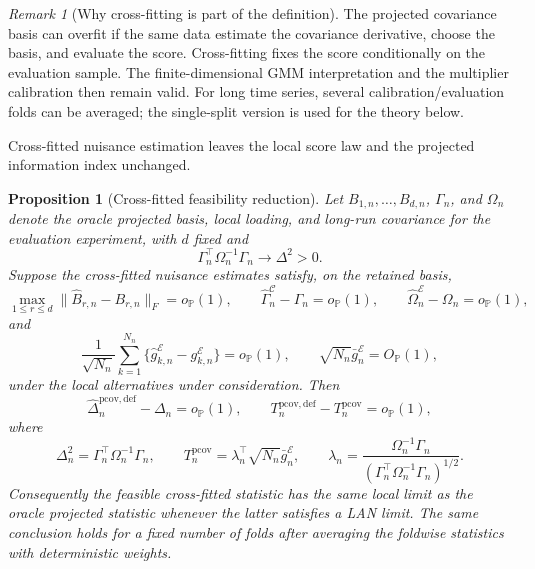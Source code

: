 \documentclass[11pt,a4paper]{amsart}
\theoremstyle{plain}
\newtheorem{proposition}[theorem]{Proposition}
\theoremstyle{definition}
\theoremstyle{remark}
\newtheorem{remark}[theorem]{Remark}
\newcommand{\PP}{\mathbb{P}}
\begin{document}
\begin{remark}[Why cross-fitting is part of the definition]
The projected covariance basis can overfit if the same data estimate the covariance derivative,
choose the basis, and evaluate the score.  Cross-fitting fixes the score conditionally on the
evaluation sample.  The finite-dimensional GMM interpretation and the multiplier calibration then
remain valid.  For long time series, several calibration/evaluation folds can be averaged; the
single-split version is used for the theory below.
\end{remark}

Cross-fitted nuisance estimation leaves the local score law and the projected information index
unchanged.

\begin{proposition}[Cross-fitted feasibility reduction]\label{prop:crossfit-feasibility}
Let \(B_{1,n},\dots,B_{d,n}\), \(\Gamma_n\), and \(\Omega_n\) denote the oracle projected basis,
local loading, and long-run covariance for the evaluation experiment, with \(d\) fixed and
\[
        \Gamma_n^\top\Omega_n^{-1}\Gamma_n\to\Delta^2>0.
\]
Suppose the cross-fitted nuisance estimates satisfy, on the retained basis,
\[
        \max_{1\le r\le d}
        \|\widehat B_{r,n}-B_{r,n}\|_F=o_{\PP}(1),
        \qquad
        \widehat\Gamma_n^{\mathcal C}-\Gamma_n=o_{\PP}(1),
        \qquad
        \widehat\Omega_n^{\mathcal E}-\Omega_n=o_{\PP}(1),
\]
and
\[
        \frac1{\sqrt{N_n}}\sum_{k=1}^{N_n}
        \{\widehat g_{k,n}^{\mathcal E}-g_{k,n}^{\mathcal E}\}
        =o_{\PP}(1),
        \qquad
        \sqrt{N_n}\bar g_n^{\mathcal E}=O_{\PP}(1),
\]
under the local alternatives under consideration.  Then
\[
        \widehat\Delta_n^{\mathrm{pcov,def}}-\Delta_n=o_{\PP}(1),
        \qquad
        T_n^{\mathrm{pcov,def}}-T_n^{\mathrm{pcov}}=o_{\PP}(1),
\]
where
\[
        \Delta_n^2=\Gamma_n^\top\Omega_n^{-1}\Gamma_n,
        \qquad
        T_n^{\mathrm{pcov}}
        =
        \lambda_n^\top\sqrt{N_n}\bar g_n^{\mathcal E},
        \qquad
        \lambda_n=
        \frac{\Omega_n^{-1}\Gamma_n}
        {(\Gamma_n^\top\Omega_n^{-1}\Gamma_n)^{1/2}}.
\]
Consequently the feasible cross-fitted statistic has the same local limit as the oracle projected
statistic whenever the latter satisfies a LAN limit.  The same conclusion holds for a fixed number
of folds after averaging the foldwise statistics with deterministic weights.
\end{proposition}
\end{document}
